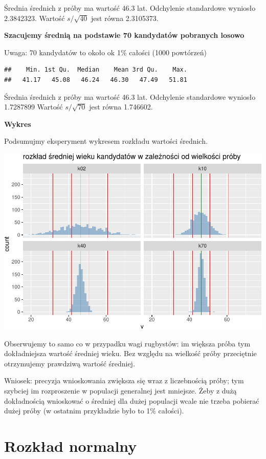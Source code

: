 \documentclass[
  openany]{book}
\begin{document}
Średnia średnich z próby ma wartość 46.3 lat.
Odchylenie standardowe wyniosło 2.3842323.
Wartość \(s/\sqrt{40}\) jest równa 2.3105373.

\textbf{Szacujemy średnią na podstawie 70 kandydatów pobranych losowo}

Uwaga: 70 kandydatów to około ok 1\% całości (1000 powtórzeń)

\begin{verbatim}
##    Min. 1st Qu.  Median    Mean 3rd Qu.    Max. 
##   41.17   45.08   46.24   46.30   47.49   51.81
\end{verbatim}

Średnia średnich z próby ma wartość 46.3 lat.
Odchylenie standardowe wyniosło 1.7287899
Wartość \(s/\sqrt{70}\) jest równa 1.746602.

\textbf{Wykres}

Podsumujmy eksperyment wykresem rozkładu wartości średnich.

\includegraphics{_main_files/figure-latex/unnamed-chunk-34-1.pdf}

Obserwujemy to samo co w przypadku wagi rugbystów: im większa próba tym
dokładniejsza wartość średniej wieku. Bez względu na wielkość próby przeciętnie
otrzymujemy prawdziwą wartość średniej.

Wniosek: precyzja wnioskowania zwiększa się wraz z liczebnością próby; tym szybciej
im rozproszenie w populacji generalnej jest mniejsze. Żeby z dużą dokładnością
wnioskować o średniej dla dużej populacji wcale nie trzeba pobierać
dużej próby (w ostatnim przykładzie było to 1\% całości).

\hypertarget{rozkux142ad-normalny}{%
\section{Rozkład normalny}\label{rozkux142ad-normalny}}
\end{document}
